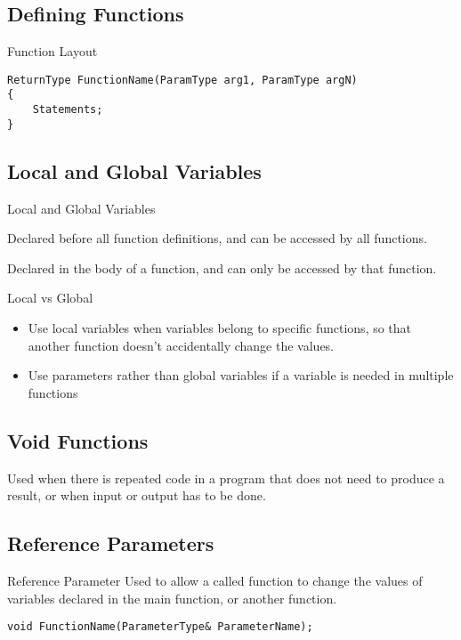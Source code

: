 \documentclass[\main/notes.tex]{subfiles}
\begin{document}
			\subsection*{Defining Functions}
				\begin{codebox}{Function Layout}
					\begin{verbatim}
ReturnType FunctionName(ParamType arg1, ParamType argN)
{
    Statements;
}
					\end{verbatim}
				\end{codebox}
			\subsection*{Local and Global Variables}
				\begin{definition}{Local and Global Variables}
					\begin{description}[nosep]
						\item[Global Variable] Declared before all function definitions, and can be accessed by all functions.
						\item[Local Variable] Declared in the body of a function, and can only be accessed by that function.
					\end{description}
				\end{definition}
				\begin{sidenote}{Local vs Global}
					\begin{itemize}[nosep]
						\item Use local variables when variables belong to specific functions, so that another function doesn't accidentally change the values.
						\item Use parameters rather than global variables if a variable is needed in multiple functions
					\end{itemize}
				\end{sidenote}
			\pagebreak
			\subsection*{Void Functions}
				Used when there is repeated code in a program that does not need to produce a result, or when input or output has to be done.
			\subsection*{Reference Parameters}
				\begin{definition}{Reference Parameter}
					Used to allow a called function to change the values of variables declared in the main function, or another function.
					\begin{verbatim}
void FunctionName(ParameterType& ParameterName);
					\end{verbatim}
				\end{definition}
\end{document}

